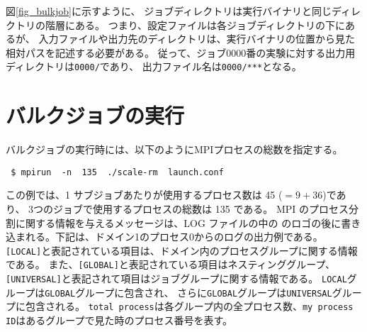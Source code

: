 図\ref{fig_bulkjob}に示すように、
ジョブディレクトリは実行バイナリと同じディレクトリの階層にある。
つまり、設定ファイルは各ジョブディレクトリの下にあるが、
入力ファイルや出力先のディレクトリは、実行バイナリの位置から見た相対パスを記述する必要がある。
従って、ジョブ0000番の実験に対する出力用ディレクトリは\verb|0000/|であり、
出力ファイル名は\verb|0000/***|となる。
{\color{blue}{ジョブディレクトリ名を付け忘れてファイル名を全実験で同じにしてしまうと、同じファイルに出力を行うためデータが消失することに注意されたい。}}

\section{バルクジョブの実行}
バルクジョブの実行時には、以下のようにMPIプロセスの総数を指定する。
\begin{verbatim}
 $ mpirun  -n  135  ./scale-rm  launch.conf
\end{verbatim}
この例では、1 サブジョブあたりが使用するプロセス数は 45 ($=9 + 36$)であり、
3つのジョブで使用するプロセスの総数は 135 である。
MPI のプロセス分割に関する情報を与えるメッセージは、LOG ファイルの中の \scalelib のロゴの後に書き込まれる。下記は、ドメイン1のプロセス0からのログの出力例である。\\
\verb|[LOCAL]|と表記されている項目は、ドメイン内のプロセスグループに関する情報である。
また、\verb|[GLOBAL]|と表記されている項目はネスティンググループ、
\verb|[UNIVERSAL]|と表記されて項目はジョブグループに関する情報である。
\verb|LOCAL|グループは\verb|GLOBAL|グループに包含され、
さらに\verb|GLOBAL|グループは\verb|UNIVERSAL|グループに包含される。
\verb|total process|は各グループ内の全プロセス数、\verb|my process ID|はあるグループで見た時のプロセス番号を表す。

